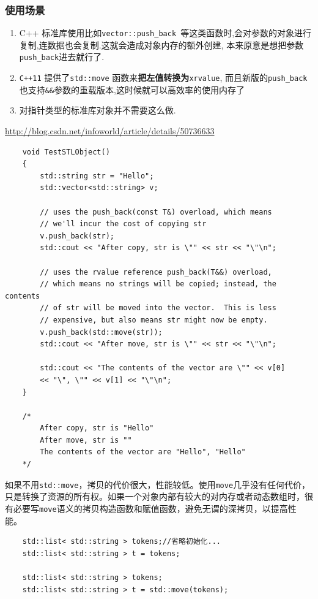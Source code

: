 \documentclass[UTF8,a4paper,12pt]{ctexbook} %
\begin{document}
			\subsubsection{使用场景}
				\begin{enumerate}
					\item C++ 标准库使用比如\verb|vector::push_back |等这类函数时,会对参数的对象进行复制,连数据也会复制.这就会造成对象内存的额外创建, 本来原意是想把参数\verb|push_back|进去就行了.
					\item \verb|C++11| 提供了\verb|std::move| 函数来\textbf{把左值转换为}\verb|xrvalue|, 而且新版的\verb|push_back|也支持\verb|&&|参数的重载版本,这时候就可以高效率的使用内存了
					\item 对指针类型的标准库对象并不需要这么做.
				\end{enumerate}	
				
				\url{http://blog.csdn.net/infoworld/article/details/50736633}
				\begin{lstlisting}
	void TestSTLObject()
	{
		std::string str = "Hello";
		std::vector<std::string> v;
		
		// uses the push_back(const T&) overload, which means
		// we'll incur the cost of copying str
		v.push_back(str);
		std::cout << "After copy, str is \"" << str << "\"\n";
		
		// uses the rvalue reference push_back(T&&) overload,
		// which means no strings will be copied; instead, the contents
		// of str will be moved into the vector.  This is less
		// expensive, but also means str might now be empty.
		v.push_back(std::move(str));
		std::cout << "After move, str is \"" << str << "\"\n";
		
		std::cout << "The contents of the vector are \"" << v[0]
		<< "\", \"" << v[1] << "\"\n";	
	}
	
	/*
		After copy, str is "Hello"
		After move, str is ""
		The contents of the vector are "Hello", "Hello"
	*/
				\end{lstlisting}
				如果不用\verb|std::move|，拷贝的代价很大，性能较低。使用\verb|move|几乎没有任何代价，只是转换了资源的所有权。如果一个对象内部有较大的对内存或者动态数组时，很有必要写\verb|move|语义的拷贝构造函数和赋值函数，避免无谓的深拷贝，以提高性能。
				\begin{lstlisting}
	std::list< std::string > tokens;//省略初始化...
	std::list< std::string > t = tokens;
	
	std::list< std::string > tokens;
	std::list< std::string > t = std::move(tokens);				
				\end{lstlisting}
\end{document}
